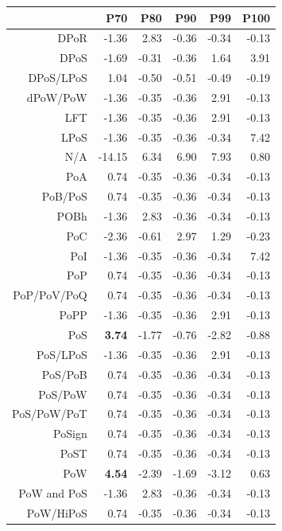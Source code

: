 \documentclass{bmcart}
\begin{document}
\begin{backmatter}
\begin{table}[ht]
	\centering
	\begin{tabular}{rrrrrr}
		\hline
		& P70 & P80 & P90 & P99 & P100 \\ 
		\hline
		DPoR & -1.36 & 2.83 & -0.36 & -0.34 & -0.13 \\ 
		DPoS & -1.69 & -0.31 & -0.36 & 1.64 & 3.91 \\ 
		DPoS/LPoS & 1.04 & -0.50 & -0.51 & -0.49 & -0.19 \\ 
		dPoW/PoW & -1.36 & -0.35 & -0.36 & 2.91 & -0.13 \\ 
		LFT & -1.36 & -0.35 & -0.36 & 2.91 & -0.13 \\ 
		LPoS & -1.36 & -0.35 & -0.36 & -0.34 & 7.42 \\ 
		N/A & -14.15 & 6.34 & 6.90 & 7.93 & 0.80 \\ 
		PoA & 0.74 & -0.35 & -0.36 & -0.34 & -0.13 \\ 
		PoB/PoS & 0.74 & -0.35 & -0.36 & -0.34 & -0.13 \\ 
		POBh & -1.36 & 2.83 & -0.36 & -0.34 & -0.13 \\ 
		PoC & -2.36 & -0.61 & 2.97 & 1.29 & -0.23 \\ 
		PoI & -1.36 & -0.35 & -0.36 & -0.34 & 7.42 \\ 
		PoP & 0.74 & -0.35 & -0.36 & -0.34 & -0.13 \\ 
		PoP/PoV/PoQ & 0.74 & -0.35 & -0.36 & -0.34 & -0.13 \\ 
		PoPP & -1.36 & -0.35 & -0.36 & 2.91 & -0.13 \\ 
		PoS & \textbf{3.74} & -1.77 & -0.76 & -2.82 & -0.88 \\ 
		PoS/LPoS & -1.36 & -0.35 & -0.36 & 2.91 & -0.13 \\ 
		PoS/PoB & 0.74 & -0.35 & -0.36 & -0.34 & -0.13 \\ 
		PoS/PoW & 0.74 & -0.35 & -0.36 & -0.34 & -0.13 \\ 
		PoS/PoW/PoT & 0.74 & -0.35 & -0.36 & -0.34 & -0.13 \\ 
		PoSign & 0.74 & -0.35 & -0.36 & -0.34 & -0.13 \\ 
		PoST & 0.74 & -0.35 & -0.36 & -0.34 & -0.13 \\ 
		PoW & \textbf{4.54} & -2.39 & -1.69 & -3.12 & 0.63 \\ 
		PoW and PoS & -1.36 & 2.83 & -0.36 & -0.34 & -0.13 \\ 
		PoW/HiPoS & 0.74 & -0.35 & -0.36 & -0.34 & -0.13 \\ 

\end{tabular}
\end{table}
\end{backmatter}
\end{document}
